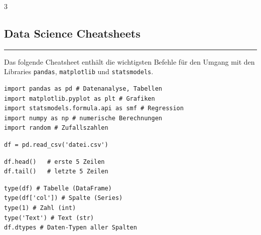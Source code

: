 \begin{landscape}
  \footnotesize
  \begin{multicols*}{3}
    \textcolor{\cheatSheetColor}{
      \begin{centering}
        \section*{Data Science Cheatsheets}
      \end{centering}
      \hrule
      Das folgende Cheatsheet enthält die wichtigsten Befehle für den Umgang mit den Libraries \texttt{pandas}, \texttt{matplotlib} und \texttt{statsmodels}.
      \vspace{0.5em}
    }
    \begin{cheatSheetBox}[title=Libraries Importieren]
      \begin{lstlisting}
import pandas as pd # Datenanalyse, Tabellen
import matplotlib.pyplot as plt # Grafiken
import statsmodels.formula.api as smf # Regression
import numpy as np # numerische Berechnungen
import random # Zufallszahlen
\end{lstlisting}
    \end{cheatSheetBox}

    \begin{cheatSheetBox}[title=CSV-Datei laden]
      \begin{lstlisting}
df = pd.read_csv('datei.csv')
\end{lstlisting}
    \end{cheatSheetBox}

    \begin{cheatSheetBox}[title=Erste/letzte Zeilen anzeigen]
      \begin{lstlisting}
df.head()   # erste 5 Zeilen
df.tail()   # letzte 5 Zeilen
\end{lstlisting}
    \end{cheatSheetBox}

    \begin{cheatSheetBox}[title=Typ einer Variable anzeigen]
      \begin{lstlisting}
type(df) # Tabelle (DataFrame)
type(df['col']) # Spalte (Series)
type(1) # Zahl (int)
type('Text') # Text (str)
df.dtypes # Daten-Typen aller Spalten
\end{lstlisting}
    \end{cheatSheetBox}


\end{multicols*}
\end{landscape}
